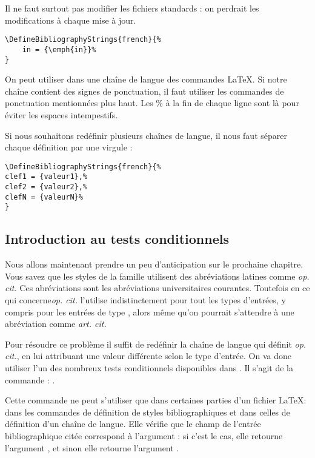 	\begin{attention}
	Il ne faut surtout pas modifier les fichiers standards : on perdrait les modifications à chaque mise à jour.
	\end{attention}
	
	\begin{verbatim}
\DefineBibliographyStrings{french}{%
	in = {\emph{in}}%
}
	\end{verbatim}
	
	On peut utiliser dans une chaîne de langue des commandes \LaTeX. Si notre chaîne contient des signes de ponctuation, il faut utiliser les commandes de ponctuation mentionnées plus haut. Les \% à la fin de chaque ligne sont là pour éviter les espaces intempestifs.
	
	Si nous souhaitons redéfinir plusieurs chaînes de langue, il nous faut séparer chaque définition par une virgule :
	
	\begin{verbatim}
\DefineBibliographyStrings{french}{%
clef1 = {valeur1},%
clef2 = {valeur2},%
clefN = {valeurN}%
}
	\end{verbatim}
	
\subsection{Introduction au tests conditionnels}\label{opcit}

Nous allons maintenant prendre un peu d'anticipation sur le prochaine chapitre.
Vous savez  que les styles de la famille  utilisent des abréviations latines comme \emph{op. cit.}
Ces abréviations sont les abréviations universitaires courantes. Toutefois en ce qui concerne\emph{op. cit.}  l'utilise indistinctement pour tout les types d'entrées, y compris pour les entrées de type , alors même qu'on pourrait s'attendre à une abréviation comme \emph{art. cit.}

Pour résoudre ce problème il suffit de redéfinir la chaîne de langue qui définit \emph{op. cit.}, en lui attribuant une valeur différente selon le type d'entrée.  On va donc utiliser l'un des nombreux tests conditionnels disponibles dans . Il s'agit de la commande : .

Cette commande ne peut s'utiliser que dans certaines parties d'un fichier \LaTeX : dans les commandes de définition de styles bibliographiques et  dans celles de définition d'un chaîne de langue. 
Elle vérifie que le champ 	de l'entrée bibliographique citée correspond à l'argument : si c'est le cas, elle retourne l'argument , et sinon elle retourne l'argument .

